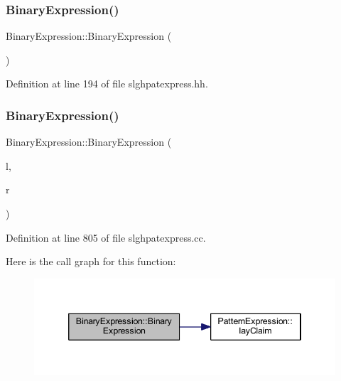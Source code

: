 \subsubsection{\texorpdfstring{BinaryExpression()}{BinaryExpression()}\hspace{0.1cm}{\footnotesize\ttfamily [1/2]}}
{\footnotesize\ttfamily Binary\+Expression\+::\+Binary\+Expression (\begin{DoxyParamCaption}\item[{void}]{ }\end{DoxyParamCaption})\hspace{0.3cm}{\ttfamily [inline]}}



Definition at line 194 of file slghpatexpress.\+hh.

\mbox{\label{class_binary_expression_ac26d83792e22e1e9c3e8b2320e945f2e}} 
\subsubsection{\texorpdfstring{BinaryExpression()}{BinaryExpression()}\hspace{0.1cm}{\footnotesize\ttfamily [2/2]}}
{\footnotesize\ttfamily Binary\+Expression\+::\+Binary\+Expression (\begin{DoxyParamCaption}\item[{\mbox{\hyperlink{class_pattern_expression}{Pattern\+Expression}} $\ast$}]{l,  }\item[{\mbox{\hyperlink{class_pattern_expression}{Pattern\+Expression}} $\ast$}]{r }\end{DoxyParamCaption})}



Definition at line 805 of file slghpatexpress.\+cc.

Here is the call graph for this function\+:
\nopagebreak
\begin{figure}[H]
\begin{center}
\leavevmode
\includegraphics[width=346pt]{class_binary_expression_ac26d83792e22e1e9c3e8b2320e945f2e_cgraph}
\end{center}
\end{figure}


